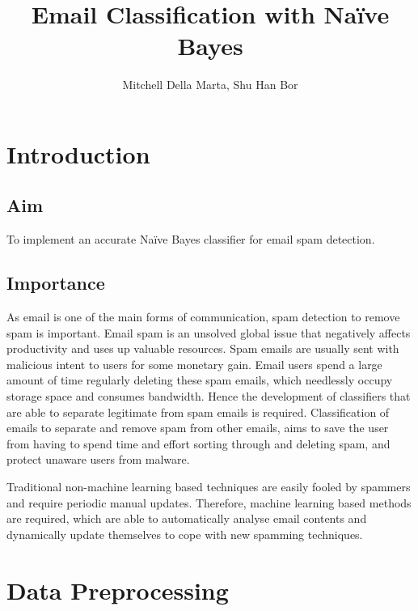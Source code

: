 \documentclass[10pt, a4paper]{article}
\title{Email Classification with Na\"ive Bayes}
\author{Mitchell Della Marta, Shu Han Bor}
\begin{document}
\setlength{\parindent}{0cm}
\setlength{\parskip}{\baselineskip}
\renewcommand\thetable{\Roman{table}}

\maketitle

\section{Introduction}

\subsection{Aim}

To implement an accurate Na\"ive Bayes classifier for email spam detection.


\subsection{Importance}

As email is one of the main forms of communication, spam detection to remove spam is important. Email spam is an unsolved global issue that negatively affects productivity and uses up valuable resources. Spam emails are usually sent with malicious intent to users for some monetary gain. Email users spend a large amount of time regularly deleting these spam emails, which needlessly occupy storage space and consumes bandwidth. Hence the development of classifiers that are able to separate legitimate from spam emails is required. Classification of emails to separate and remove spam from other emails, aims to save the user from having to spend time and effort sorting through and deleting spam, and protect unaware users from malware.

Traditional non-machine learning based techniques are easily fooled by spammers and require periodic manual updates. Therefore, machine learning based methods are required, which are able to automatically analyse email contents and dynamically update themselves to cope with new spamming techniques.

\section{Data Preprocessing}
\end{document}

